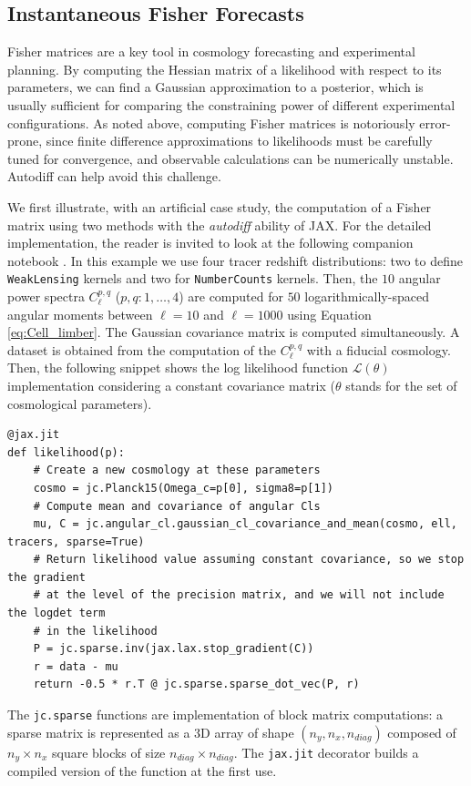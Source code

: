 \documentclass[twocolumn,twocolappendix,nofootinbib,iop]{openjournal}
\newcommand{\nblink}[1]{\href{https://github.com/DifferentiableUniverseInitiative/jax-cosmo-paper/blob/master/notebooks/#1.ipynb}{\faFileCodeO}}
\begin{document}
\subsection{Instantaneous Fisher Forecasts}
Fisher matrices are a key tool in cosmology forecasting and experimental planning. By computing the Hessian matrix of a likelihood with respect to its parameters, we can find a Gaussian approximation to a posterior, which is usually sufficient for comparing the constraining power of different experimental configurations. As noted above, computing Fisher matrices is notoriously error-prone, since finite difference approximations to likelihoods must be carefully tuned for convergence, and observable calculations can be numerically unstable. Autodiff can help avoid this challenge.

We first illustrate, with an artificial case study, the computation of a Fisher matrix \citep{1997ApJ...480...22T,Stuart1991} using two methods with the \textit{autodiff} ability of JAX. For the detailed implementation, the reader is invited to look at the following companion notebook \nblink{Simple-Fisher}. In this example we use four tracer redshift distributions: two to define \texttt{WeakLensing} kernels and two for \texttt{NumberCounts} kernels. Then, the $10$ angular power spectra $C_\ell^{p,q}$ ($p,q:1,\dots,4$) are computed for $50$  logarithmically-spaced angular moments between $\ell=10$ and $\ell=1000$ using Equation \ref{eq:Cell_limber}. The Gaussian covariance matrix is computed simultaneously. A dataset is obtained from the computation of the $C_\ell^{p,q}$ with a fiducial cosmology. Then, the following snippet shows the log likelihood function $\mathcal{L}(\theta)$ implementation considering a constant covariance matrix ($\theta$ stands for the set of cosmological parameters). 
\begin{lstlisting}[language=iPython]
@jax.jit
def likelihood(p):
    # Create a new cosmology at these parameters
    cosmo = jc.Planck15(Omega_c=p[0], sigma8=p[1])
    # Compute mean and covariance of angular Cls
    mu, C = jc.angular_cl.gaussian_cl_covariance_and_mean(cosmo, ell, tracers, sparse=True)
    # Return likelihood value assuming constant covariance, so we stop the gradient
    # at the level of the precision matrix, and we will not include the logdet term
    # in the likelihood
    P = jc.sparse.inv(jax.lax.stop_gradient(C))
    r = data - mu
    return -0.5 * r.T @ jc.sparse.sparse_dot_vec(P, r)
\end{lstlisting}
The \texttt{jc.sparse} functions are implementation of block matrix computations: a sparse matrix is represented as a 3D array of shape $(n_y, n_x, n_{diag})$ composed of $n_y \times n_x$ square blocks of size $n_{diag} \times n_{diag}$.  The \texttt{jax.jit} decorator builds a compiled version of the function at the first use. 
\end{document}
